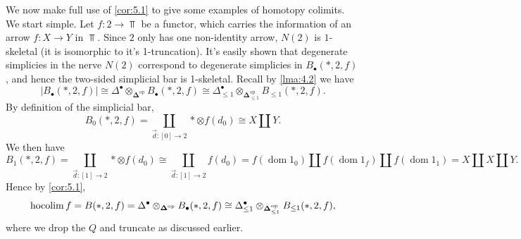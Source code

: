 We now make full use of \cref{cor:5.1} to give some examples of homotopy colimits. We start simple. Let $f : 2 \to \Top $ be a functor, which carries the information of an arrow $f : X \to Y$ in $\Top $. Since $2$ only has one non-identity arrow, $N(2)$ is $1$-skeletal (it is isomorphic to it's 1-truncation). It's easily shown that degenerate simplicies in the nerve $N(2)$ correspond to degenerate simplicies in $B_{\bullet} (*,2,f)$, and hence the two-sided simplicial bar is 1-skeletal. Recall by \cref{lma:4.2} we have
\[
	\left| B_{\bullet} (*,2,f) \right| \cong \Delta^{\bullet} \otimes_{\boldsymbol{\Delta} ^{\mathrm{op}} } B_{\bullet} (*,2,f)\cong \Delta^{\bullet} _{\leq 1} \otimes_{\boldsymbol{\Delta} ^{\mathrm{op}} _{\leq 1} } B_{\leq 1} (*,2,f)
.\]
By definition of the simplicial bar,
\[
	B_0(*,2,f)=\coprod_{\vec{d} : [0] \to 2} * \otimes f(d_0)\cong X\amalg Y
.\]
We then have
\[
	B_1(*,2,f)=\coprod_{\vec{d} : [1] \to 2} *\otimes f(d_0)\cong \coprod_{\vec{d} : [1] \to 2} f(d_0)=f(\operatorname{dom} 1_0)\amalg f(\operatorname{dom} 1_f)\amalg f(\operatorname{dom} 1_1)=X\amalg X\amalg Y
.\]
Hence by \cref{cor:5.1},
\[
	\operatorname*{hocolim} f=B(*,2,f)=\Delta^{\bullet} \otimes_{\boldsymbol{\Delta} ^{\mathrm{op}} } B_{\bullet} (*,2,f)\cong\Delta^{\bullet} _{\leq 1} \otimes_{\boldsymbol{\Delta} ^{\mathrm{op}} _{\leq 1} } B_{\leq 1} (*,2,f),
\]
where we drop the $Q$ and truncate as discussed earlier.

